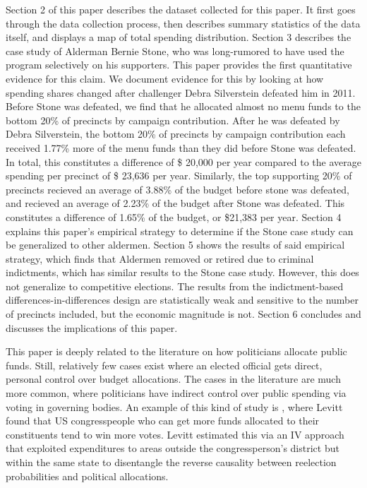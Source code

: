 Section 2 of this paper describes the dataset collected for this paper. 
It first goes through the data collection process, then describes summary statistics of the data itself, and displays a map of total spending distribution.
Section 3 describes the case study of Alderman Bernie Stone, who was long-rumored to have used the program selectively on his supporters.
This paper provides the first quantitative evidence for this claim.
We document evidence for this by looking at how spending shares changed after challenger Debra Silverstein defeated him in 2011. 
Before Stone was defeated, we find that he allocated almost no menu funds to the bottom 20\% of precincts by campaign contribution. 
After he was defeated by Debra Silverstein, the bottom 20\% of precincts by campaign contribution each received 1.77\% more of the menu funds than they did before Stone was defeated.
In total, this constitutes a difference of \$ 20,000 per year compared to the average spending per precinct of \$ 23,636 per year. 
Similarly, the top supporting 20\% of precincts recieved an average of 3.88\% of the budget before stone was defeated, and recieved an average of 2.23\% of the budget after Stone was defeated. 
This constitutes a difference of 1.65\% of the budget, or \$21,383 per year.
Section 4 explains this paper's empirical strategy to determine if the Stone case study can be generalized to other aldermen.
Section 5 shows the results of said empirical strategy, which finds that Aldermen removed or retired due to criminal indictments, which has similar results to the Stone case study. 
However, this does not generalize to competitive elections.
The results from the indictment-based differences-in-differences design are statistically weak and sensitive to the number of precincts included, but the economic magnitude is not. 
Section 6 concludes and discusses the implications of this paper.

This paper is deeply related to the literature on how politicians allocate public funds. Still, relatively few cases exist where an elected official gets direct, personal control over budget allocations. 
The cases in the literature are much more common, where politicians have indirect control over public spending via voting in governing bodies.
An example of this kind of study is \cite{levitt1997impact}, where Levitt found that US congresspeople who can get more funds allocated to their constituents tend to win more votes. 
Levitt estimated this via an IV approach that exploited expenditures to areas outside the congressperson's district but within the same state to disentangle the reverse causality between reelection probabilities and political allocations. 

